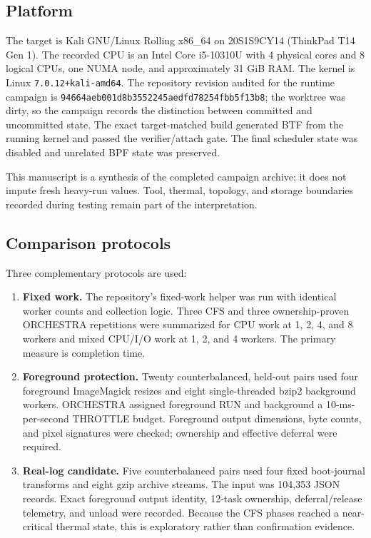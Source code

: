 \documentclass[10pt,letterpaper,twocolumn]{article}
\newcommand{\hostid}{20S1S9CY14 (ThinkPad T14 Gen 1)}
\begin{document}
\subsection{Platform}

The target is Kali GNU/Linux Rolling x86\_64 on \hostid. The recorded CPU is an Intel Core i5-10310U with 4 physical cores and 8 logical CPUs, one NUMA node, and approximately 31 GiB RAM. The kernel is Linux \texttt{7.0.12+kali-amd64}. The repository revision audited for the runtime campaign is \texttt{94664aeb001d8b3552245aedfd78254fbb5f13b8}; the worktree was dirty, so the campaign records the distinction between committed and uncommitted state. The exact target-matched build generated BTF from the running kernel and passed the verifier/attach gate. The final scheduler state was disabled and unrelated BPF state was preserved.

This manuscript is a synthesis of the completed campaign archive; it does not
impute fresh heavy-run values. Tool, thermal, topology, and storage boundaries
recorded during testing remain part of the interpretation.

\subsection{Comparison protocols}

Three complementary protocols are used:

\begin{enumerate}
  \item \textbf{Fixed work.} The repository's fixed-work helper was run with identical worker counts and collection logic. Three CFS and three ownership-proven ORCHESTRA repetitions were summarized for CPU work at 1, 2, 4, and 8 workers and mixed CPU/I/O work at 1, 2, and 4 workers. The primary measure is completion time.
  \item \textbf{Foreground protection.} Twenty counterbalanced, held-out pairs used four foreground ImageMagick resizes and eight single-threaded bzip2 background workers. ORCHESTRA assigned foreground RUN and background a 10-ms-per-second THROTTLE budget. Foreground output dimensions, byte counts, and pixel signatures were checked; ownership and effective deferral were required.
  \item \textbf{Real-log candidate.} Five counterbalanced pairs used four fixed boot-journal transforms and eight gzip archive streams. The input was 104,353 JSON records. Exact foreground output identity, 12-task ownership, deferral/release telemetry, and unload were recorded. Because the CFS phases reached a near-critical thermal state, this is exploratory rather than confirmation evidence.
\end{enumerate}
\end{document}
